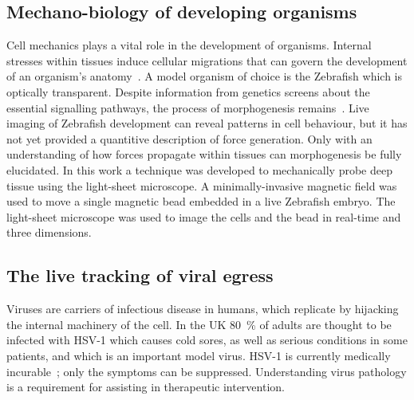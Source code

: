 \subsection{Mechano-biology of developing organisms}\label{sec:motivation/tweezers}

Cell mechanics plays a vital role in the development of organisms.
Internal stresses within tissues induce cellular migrations that can govern the development of an organism's anatomy~\cite{gilbertDevelopmentalBiology2000}.
A model organism of choice is the Zebrafish which is optically transparent.
Despite information from genetics screens about the essential signalling pathways, the process of morphogenesis remains~\cite{mammotoMechanicalControlTissue2010,mammotoMechanobiologyDevelopmentalControl2013}.
Live imaging of Zebrafish development can reveal patterns in cell behaviour, but it has not yet provided a quantitive description of force generation.
Only with an understanding of how forces propagate within tissues can morphogenesis be fully elucidated.
%
In this work a technique was developed to mechanically probe deep tissue using the light-sheet microscope.
A minimally-invasive magnetic field was used to move a single magnetic bead embedded in a live Zebrafish embryo.
The light-sheet microscope was used to image the cells and the bead in real-time and three dimensions.

\subsection{The live tracking of viral egress}\label{sec:motivation/spt}

Viruses are carriers of infectious disease in humans, which replicate by hijacking the internal %
machinery of the cell.
In the UK \SI{80}{\percent} of adults are thought to be infected with \gls{HSV}-1 which causes cold sores, as well as serious conditions in some patients, and which is an important model virus.
\gls{HSV}-1 is currently medically incurable~\cite{_herpes_????}; only the symptoms can be suppressed.
Understanding virus pathology is a requirement for assisting in therapeutic intervention.

